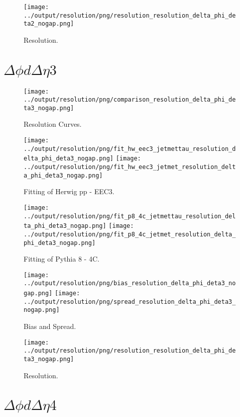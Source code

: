 \documentclass[11pt]{book}
\begin{document}
\begin{figure}[ht]
\centering
\texttt{[image: ../output/resolution/png/resolution\_resolution\_delta\_phi\_deta2\_nogap.png]}
\caption{Resolution.}
\end{figure}
\clearpage

\section{$\Delta\phi d\Delta\eta 3$}

\begin{figure}[ht]
\centering
\texttt{[image: ../output/resolution/png/comparison\_resolution\_delta\_phi\_deta3\_nogap.png]}
\caption{Resolution Curves.}
\end{figure}


\begin{figure}[ht]
\centering
\texttt{[image: ../output/resolution/png/fit\_hw\_eec3\_jetmettau\_resolution\_delta\_phi\_deta3\_nogap.png]}
\texttt{[image: ../output/resolution/png/fit\_hw\_eec3\_jetmet\_resolution\_delta\_phi\_deta3\_nogap.png]}
\caption{Fitting of Herwig pp - EEC3.}
\end{figure}

\begin{figure}[ht]
\centering
\texttt{[image: ../output/resolution/png/fit\_p8\_4c\_jetmettau\_resolution\_delta\_phi\_deta3\_nogap.png]}
\texttt{[image: ../output/resolution/png/fit\_p8\_4c\_jetmet\_resolution\_delta\_phi\_deta3\_nogap.png]}
\caption{Fitting of Pythia 8 - 4C.}
\end{figure}

\begin{figure}[ht]
\centering
\texttt{[image: ../output/resolution/png/bias\_resolution\_delta\_phi\_deta3\_nogap.png]}
\texttt{[image: ../output/resolution/png/spread\_resolution\_delta\_phi\_deta3\_nogap.png]}
\caption{Bias and Spread.}
\end{figure}


\begin{figure}[ht]
\centering
\texttt{[image: ../output/resolution/png/resolution\_resolution\_delta\_phi\_deta3\_nogap.png]}
\caption{Resolution.}
\end{figure}
\clearpage

\section{$\Delta\phi d\Delta\eta 4$}
\end{document}
